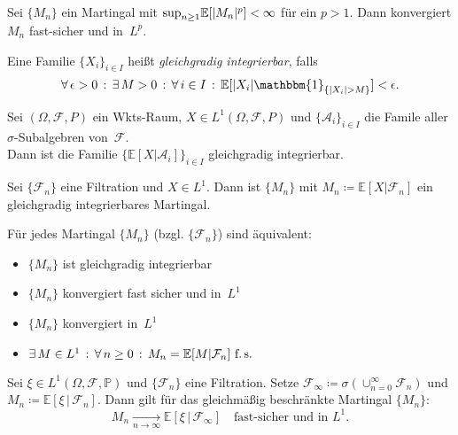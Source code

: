 \documentclass{cheat-sheet}
\renewcommand{\P}{\mathbb{P}} %
\newcommand{\E}{\mathbb{E}} %
\newcommand{\ind}{\mathbbm{1}} %
\newcommand{\Alg}{\mathcal{A}} %
\newcommand{\Filt}{\mathcal{F}} %
\begin{document}
\begin{satz}
  Sei $\{ M_n \}$ ein Martingal mit ${\sup}_{n \geq 1} \E[\abs{M_n}^p] < \infty$ für ein $p > 1$.
  Dann konvergiert $M_n$ fast-sicher und in~$L^p$.
\end{satz}


\begin{defn}
  Eine Familie $\{ X_i \}_{i \in I}$ heißt \emph{gleichgradig integrierbar}, falls
  \[
    \fa{\epsilon > 0} \ex{M > 0} \fa{i \in I} \E[ \abs{X_i} \ind_{\{ \abs{X_i} > M \}} ] < \epsilon.
  \]
\end{defn}

\begin{lem}
  Sei $(\Omega, \mathcal{F}, P)$ ein Wkts-Raum, $X \in L^1(\Omega, \mathcal{F}, P)$ und $\{ \Alg_i \}_{i \in I}$ die Famile aller $\sigma$-Subalgebren von~$\mathcal{F}$. \\
  Dann ist die Familie $\{ \E[ X | \Alg_i ] \}_{i \in I}$ gleichgradig integrierbar.
\end{lem}

\begin{lem}
  Sei $\{ \Filt_n \}$ eine Filtration und $X \in L^1$.
  Dann ist $\{ M_n \}$ mit $M_n \coloneqq \E[ X | \Filt_n ]$ ein gleichgradig integrierbares Martingal.
\end{lem}

\begin{satz}
  Für jedes Martingal $\{ M_n \}$ (bzgl. $\{ \Filt_n \}$) sind äquivalent:
  \begin{itemize}
    \item $\{ M_n \}$ ist gleichgradig integrierbar
    \item $\{ M_n \}$ konvergiert fast sicher und in~$L^1$
    \item $\{ M_n \}$ konvergiert in~$L^1$
    \item $\ex{M \in L^1} \fa{n \geq 0} M_n = \E[ M | \Filt_n ] \text{ f.\,s.}$
  \end{itemize}
\end{satz}

\begin{satz}
  Sei $\xi \in L^1(\Omega, \mathcal{F}, \P)$ und $\{ \mathcal{F}_n \}$ eine Filtration.
  Setze $\mathcal{F}_\infty \coloneqq \sigma(\cup_{n=0}^\infty \mathcal{F}_n)$ und $M_n \coloneqq \E[ \xi \,|\, \mathcal{F}_n ]$.
  Dann gilt für das gleichmäßig beschränkte Martingal $\{ M_n \}$:
  \[
    M_n \xrightarrow[n \to \infty]{} \E[ \xi \,|\, \mathcal{F}_\infty ]
    \quad \text{fast-sicher und in $L^1$.}
  \]
\end{satz}
\end{document}
